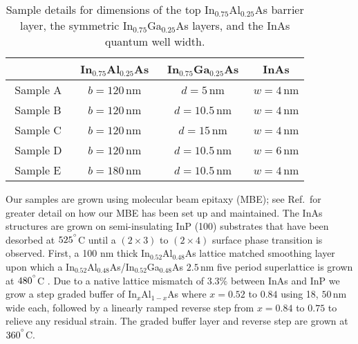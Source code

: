 \documentclass[
floatfix,
aps,
prl,
twocolumn,
superscriptaddress,
amssymb,
 groupaddress,
]{revtex4}
\begin{document}
\begin{table}[b]
  \begin{tabular}{ | l | c | c | c | }
    \hline
    \, & \,\,In$_{0.75}$Al$_{0.25}$As\,\, & \,\,In$_{0.75}$Ga$_{0.25}$As\,\, & \,\,InAs\,\, \\ \hline
    \,\,Sample A\,\, & $b=120\,$nm & $d=5\,$nm & $w=4\,$nm \\ \hline
    \,\,Sample B\,\, & $b=120\,$nm & $d=10.5\,$nm & $w=4\,$nm \\ \hline
    \,\,Sample C\,\, & $b=120\,$nm & $d=15\,$nm & $w=4\,$nm  \\ \hline
    \,\,Sample D\,\, & $b=120\,$nm & $d=10.5\,$nm & $w=6\,$nm \\ \hline
    \,\,Sample E\,\, & $b=180\,$nm & $d=10.5\,$nm & $w=4\,$nm \\ 
    \hline
  \end{tabular}
  \caption{Sample details for dimensions of the top In$_{0.75}$Al$_{0.25}$As barrier layer,  the symmetric In$_{0.75}$Ga$_{0.25}$As layers, and the InAs quantum well width.}
\label{table}
\end{table}

Our samples are grown using molecular beam epitaxy (MBE); see Ref.\,\citep{gardner:2016} for greater detail on how our MBE has been set up and maintained.
The InAs structures are grown on semi-insulating InP (100) substrates that have been desorbed at $525^{\degree}$C until a $(2\times3)$ to $(2\times4)$ surface phase transition is observed.
First, a 100 nm thick In$_{0.52}$Al$_{0.48}$As lattice matched smoothing layer upon which a In$_{0.52}$Al$_{0.48}$As/In$_{0.52}$Ga$_{0.48}$As  $2.5\,$nm five period superlattice is grown at $480^{\degree}$C \citep{heyn:2003}.
Due to a native lattice mismatch of 3.3$\%$ between InAs and InP we grow a step graded buffer of In$_{x}$Al$_{1-x}$As where $x=0.52$ to $0.84$ using 18, $50\,$nm wide each, followed by a linearly ramped reverse step from $x=0.84$ to $0.75$ to relieve any residual strain.  
The graded buffer layer and reverse step are grown at $360^{\degree}$C.
\end{document}
